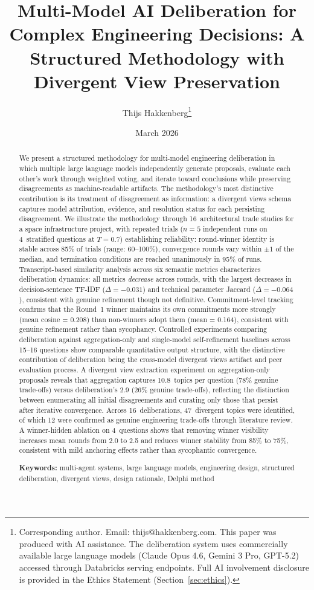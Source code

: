 \documentclass[11pt,a4paper]{article}
\title{\textbf{Multi-Model AI Deliberation for Complex Engineering Decisions: A Structured Methodology with Divergent View Preservation}}
\author{Thijs Hakkenberg\thanks{Corresponding author. Email: thijs@hakkenberg.com. This paper was produced with AI assistance. The deliberation system uses commercially available large language models (Claude Opus 4.6, Gemini 3 Pro, GPT-5.2) accessed through Databricks serving endpoints. Full AI involvement disclosure is provided in the Ethics Statement (Section~\ref{sec:ethics}).}}
\affil{Project Dyson, Open Research Initiative\\ \texttt{https://projectdyson.org}}
\date{March 2026}
\begin{document}
\maketitle

\begin{abstract}
We present a structured methodology for multi-model engineering deliberation in which multiple large language models independently generate proposals, evaluate each other's work through weighted voting, and iterate toward conclusions while preserving disagreements as machine-readable artifacts. The methodology's most distinctive contribution is its treatment of disagreement as information: a divergent views schema captures model attribution, evidence, and resolution status for each persisting disagreement. We illustrate the methodology through 16~architectural trade studies for a space infrastructure project, with repeated trials ($n = 5$ independent runs on 4~stratified questions at $T = 0.7$) establishing reliability: round-winner identity is stable across 85\% of trials (range: 60--100\%), convergence rounds vary within $\pm 1$ of the median, and termination conditions are reached unanimously in 95\% of runs. Transcript-based similarity analysis across six semantic metrics characterizes deliberation dynamics: all metrics \emph{decrease} across rounds, with the largest decreases in decision-sentence TF-IDF ($\Delta = -0.031$) and technical parameter Jaccard ($\Delta = -0.064$), consistent with genuine refinement though not definitive. Commitment-level tracking confirms that the Round~1 winner maintains its own commitments more strongly (mean cosine = 0.208) than non-winners adopt them (mean = 0.164), consistent with genuine refinement rather than sycophancy. Controlled experiments comparing deliberation against aggregation-only and single-model self-refinement baselines across 15--16 questions show comparable quantitative output structure, with the distinctive contribution of deliberation being the cross-model divergent views artifact and peer evaluation process. A divergent view extraction experiment on aggregation-only proposals reveals that aggregation captures 10.8~topics per question (78\% genuine trade-offs) versus deliberation's 2.9 (26\% genuine trade-offs), reflecting the distinction between enumerating all initial disagreements and curating only those that persist after iterative convergence. Across 16~deliberations, 47~divergent topics were identified, of which 12 were confirmed as genuine engineering trade-offs through literature review. A winner-hidden ablation on 4~questions shows that removing winner visibility increases mean rounds from 2.0 to 2.5 and reduces winner stability from 85\% to 75\%, consistent with mild anchoring effects rather than sycophantic convergence.

\medskip
\noindent\textbf{Keywords:} multi-agent systems, large language models, engineering design, structured deliberation, divergent views, design rationale, Delphi method
\end{abstract}
\end{document}
